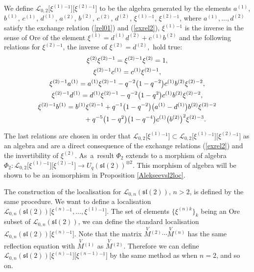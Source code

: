 \documentclass[pdftex]{sigma}%
\numberwithin{equation}{section}
\numberwithin{figure}{section}
\newcommand{\Ll}{{\mathcal L}}
\begin{document}
We define $\Ll_{0,2}\big[\xi^{(1)}{}^{-1}\big]\big[\xi^{(2)}{}^{-1}\big]$ to be the algebra generated by the elements
$a^{(1)}$, $b^{(1)}$, $c^{(1)}$, $d^{(1)}$,
$ a^{(2)}$, $b^{(2)}$, $c^{(2)}$, $d^{(2)}$, $\xi^{(1)}{}^{-1}$, $\xi^{(2)}{}^{-1}$,
where $a^{(1)},\dots, d^{(2)}$ satisfy the exchange relation (\ref{rel01}) and (\ref{exrel2}), $\xi^{(1)}{}^{-1}$ is the inverse in the sense of Ore of the element
$\xi^{(1)}=d^{(1)}d^{(2)}+c^{(1)}b^{(2)}$ and the following relations for $\xi^{(2)}{}^{-1}$, the inverse of $\xi^{(2)}=d^{(2)},$ hold true:
\begin{gather*}
\xi^{(2)} \xi^{(2)}{}^{-1}=\xi^{(2)}{}^{-1}\xi^{(2)}=1, \\
\xi^{(2)}{}^{-1}c^{(1)}=c^{(1)}\xi^{(2)}{}^{-1},\\
\xi^{(2)}{}^{-1}a^{(1)}=a^{(1)}\xi^{(2)}{}^{-1}-q^{-2}\big(1-q^{-2}\big) c^{(1)}b^{(2)}\xi^{(2)}{}^{-2},\\
\xi^{(2)}{}^{-1}d^{(1)}=d^{(1)}\xi^{(2)}{}^{-1}-q^{-2}\big(1-q^{2}\big)c^{(1)}b^{(2)}\xi^{(2)}{}^{-2},\\
\xi^{(2)}{}^{-1}b^{(1)}=b^{(1)}\xi^{(2)}{}^{-1}+q^{-1}\big(1-q^{-2}\big)\big(a^{(1)}-d^{(1)}\big)b^{(2)}\xi^{(2)}{}^{-2}
\\ \hphantom{\xi^{(2)}{}^{-1}b^{(1)}=}
{}+q^{-5}\big(1-q^{2}\big)\big(1-q^{-4}\big) c^{(1)}\big(b^{(2)}\big)^2\xi^{(2)}{}^{-3}.
\end{gather*}

The last relations are chosen in order that $\Ll_{0,2}\big[\xi^{(1)}{}^{-1}\big]\subset \Ll_{0,2}\big[\xi^{(1)}{}^{-1}\big]\big[\xi^{(2)}{}^{-1}\big]$ as an algebra and are a direct consequence of the exchange relations (\ref{exrel2}) and the invertibility of $\xi^{(2)}.$
As~a~result $\Phi_2$ extends to a morphism of algebra $\Phi_2\colon \Ll_{0,2}\big[\xi^{(1)}{}^{-1}\big]\big[\xi^{(2)}{}^{-1}\big]\rightarrow U_q({\mathfrak{sl}}(2))^{\otimes 2}.$ This morphism of algebra will be shown to be an isomorphism in Proposition \ref{Alekseevsl2loc}.

The construction of the localisation for $\Ll_{0,n}({\mathfrak{sl}}(2))$, $n>2$, is defined by the same procedure.
We want to define a localisation $\Ll_{0,n}({\mathfrak{sl}}(2))\big[\xi^{(n)}{}^{-1},\dots, \xi^{(1)}{}^{-1}\big]$. The set of elements $\big\{\xi^{(n)k}\big\}_k$ being an Ore subset of $\Ll_{0,n}({\mathfrak{sl}}(2))$, we can define the standard localisation $\Ll_{0,n}({\mathfrak{sl}}(2))\big[\xi^{(n)}{}^{-1}\big]$. Note that the matrix $\stackrel{V}{M}{}^{\!\! (2)}\cdots \stackrel{V}{M}{}^{\!\! (n)}$ has the same reflection equation with $\stackrel{V}{M}{}^{\!\! (1)}$ as
$\stackrel{V}{M}{}^{\!\! (2)}.$ Therefore we can define $\Ll_{0,n}({\mathfrak{sl}}(2))\big[\xi^{(n)}{}^{-1}\big]\big[\xi^{(n-1)}{}^{-1}\big]$ by the same method as when $n=2$, and so on.
\end{document}
